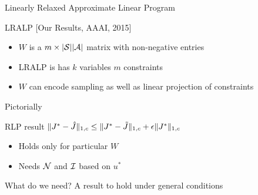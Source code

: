 \documentclass[10pt]{beamer}
\begin{document}
\begin{frame}[fragile]{Linearly Relaxed Approximate Linear Program}

\begin{algorithm}[H]
\caption*{LRALP [Our Results, AAAI, 2015]}
\begin{algorithmic}[1]
\STATE{\}}
\end{algorithmic}
\end{algorithm}
\p
\begin{itemize}
\item $W$ is a $m\times |\mathcal{S}||\mathcal{A}|$ matrix with non-negative entries\p
\item LRALP is has $k$ variables $m$ constraints\p
\item $W$ can encode sampling as well as linear projection of constraints
\end{itemize}
\end{frame}

\begin{frame}[fragile]{Pictorially}

\begin{block}{RLP result}
$\|J^*-\hat{J}\|_{1,c}\leq \|J^*-\tilde{J}\|_{1,c}+\epsilon\|J^*\|_{1,c}$
\begin{itemize}
\item Holds only for particular $W$
\item Needs $\mathcal{N}$ and $\mathcal{I}$ based on $u^*$
\end{itemize}
\end{block}
\begin{block}{What do we need?}
 A result to hold under general conditions
\end{block}

\end{frame}
\end{document}
